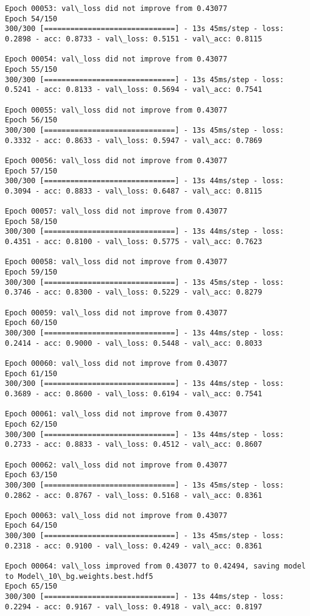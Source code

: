 \documentclass[11pt]{article}
\begin{document}
\begin{Verbatim}[commandchars=\\\{\}]
Epoch 00053: val\_loss did not improve from 0.43077
Epoch 54/150
300/300 [==============================] - 13s 45ms/step - loss: 0.2898 - acc: 0.8733 - val\_loss: 0.5151 - val\_acc: 0.8115

Epoch 00054: val\_loss did not improve from 0.43077
Epoch 55/150
300/300 [==============================] - 13s 45ms/step - loss: 0.5241 - acc: 0.8133 - val\_loss: 0.5694 - val\_acc: 0.7541

Epoch 00055: val\_loss did not improve from 0.43077
Epoch 56/150
300/300 [==============================] - 13s 45ms/step - loss: 0.3332 - acc: 0.8633 - val\_loss: 0.5947 - val\_acc: 0.7869

Epoch 00056: val\_loss did not improve from 0.43077
Epoch 57/150
300/300 [==============================] - 13s 44ms/step - loss: 0.3094 - acc: 0.8833 - val\_loss: 0.6487 - val\_acc: 0.8115

Epoch 00057: val\_loss did not improve from 0.43077
Epoch 58/150
300/300 [==============================] - 13s 44ms/step - loss: 0.4351 - acc: 0.8100 - val\_loss: 0.5775 - val\_acc: 0.7623

Epoch 00058: val\_loss did not improve from 0.43077
Epoch 59/150
300/300 [==============================] - 13s 45ms/step - loss: 0.3746 - acc: 0.8300 - val\_loss: 0.5229 - val\_acc: 0.8279

Epoch 00059: val\_loss did not improve from 0.43077
Epoch 60/150
300/300 [==============================] - 13s 44ms/step - loss: 0.2414 - acc: 0.9000 - val\_loss: 0.5448 - val\_acc: 0.8033

Epoch 00060: val\_loss did not improve from 0.43077
Epoch 61/150
300/300 [==============================] - 13s 44ms/step - loss: 0.3689 - acc: 0.8600 - val\_loss: 0.6194 - val\_acc: 0.7541

Epoch 00061: val\_loss did not improve from 0.43077
Epoch 62/150
300/300 [==============================] - 13s 44ms/step - loss: 0.2733 - acc: 0.8833 - val\_loss: 0.4512 - val\_acc: 0.8607

Epoch 00062: val\_loss did not improve from 0.43077
Epoch 63/150
300/300 [==============================] - 13s 45ms/step - loss: 0.2862 - acc: 0.8767 - val\_loss: 0.5168 - val\_acc: 0.8361

Epoch 00063: val\_loss did not improve from 0.43077
Epoch 64/150
300/300 [==============================] - 13s 45ms/step - loss: 0.2318 - acc: 0.9100 - val\_loss: 0.4249 - val\_acc: 0.8361

Epoch 00064: val\_loss improved from 0.43077 to 0.42494, saving model to Model\_10\_bg.weights.best.hdf5
Epoch 65/150
300/300 [==============================] - 13s 44ms/step - loss: 0.2294 - acc: 0.9167 - val\_loss: 0.4918 - val\_acc: 0.8197


\end{Verbatim}
\end{document}
